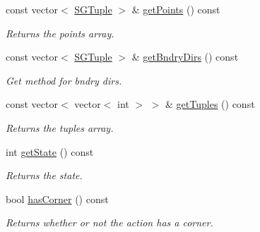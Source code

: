 \begin{DoxyCompactItemize}
\mbox{\label{classSGBaseAction_a45df07dd310cdaf3bf15e18a894c9ac5}} 
const vector$<$ \hyperlink{classSGTuple}{S\+G\+Tuple} $>$ \& \hyperlink{classSGBaseAction_a45df07dd310cdaf3bf15e18a894c9ac5}{get\+Points} () const
\begin{DoxyCompactList}\small\item\em Returns the points array. \end{DoxyCompactList}\item 
\mbox{\label{classSGBaseAction_a7324f4465451d2ed6d3564c1090f35e7}} 
const vector$<$ \hyperlink{classSGTuple}{S\+G\+Tuple} $>$ \& \hyperlink{classSGBaseAction_a7324f4465451d2ed6d3564c1090f35e7}{get\+Bndry\+Dirs} () const
\begin{DoxyCompactList}\small\item\em Get method for bndry dirs. \end{DoxyCompactList}\item 
\mbox{\label{classSGBaseAction_a54af128dba67e36ba5dd41728ac4998b}} 
const vector$<$ vector$<$ int $>$ $>$ \& \hyperlink{classSGBaseAction_a54af128dba67e36ba5dd41728ac4998b}{get\+Tuples} () const
\begin{DoxyCompactList}\small\item\em Returns the tuples array. \end{DoxyCompactList}\item 
\mbox{\label{classSGBaseAction_a8871a365591c09a8aae02eb2df29d7b8}} 
int \hyperlink{classSGBaseAction_a8871a365591c09a8aae02eb2df29d7b8}{get\+State} () const
\begin{DoxyCompactList}\small\item\em Returns the state. \end{DoxyCompactList}\item 
\mbox{\label{classSGBaseAction_ad23f122ff41f72b3cc161166905a13d8}} 
bool \hyperlink{classSGBaseAction_ad23f122ff41f72b3cc161166905a13d8}{has\+Corner} () const
\begin{DoxyCompactList}\small\item\em Returns whether or not the action has a corner. \end{DoxyCompactList}\item 
\mbox{\label{classSGBaseAction_a860147b2ecb19aab60194ac0fe5f75db}} 

\end{DoxyCompactItemize}
